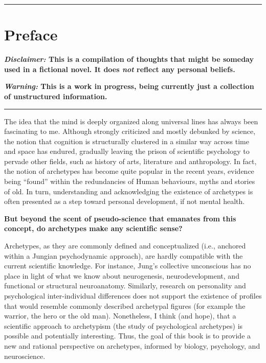 \documentclass[
]{book}
\begin{document}
\begin{center}\rule{0.5\linewidth}{0.5pt}\end{center}

\hypertarget{preface}{%
\chapter*{Preface}\label{preface}}

\textbf{\emph{Disclaimer:} This is a compilation of thoughts that might be someday used in a fictional novel. It does \emph{not} reflect any personal beliefs.}

\textbf{\emph{Warning:} This is a work in progress, being currently just a collection of unstructured information.}

\begin{center}\rule{0.5\linewidth}{0.5pt}\end{center}

The idea that the mind is deeply organized along universal lines has always been fascinating to me. Although strongly criticized and mostly debunked by science, the notion that cognition is structurally clustered in a similar way across time and space has endured, gradually leaving the prison of scientific psychology to pervade other fields, such as history of arts, literature and anthropology. In fact, the notion of archetypes has become quite popular in the recent years, evidence being ``found'' within the redundancies of Human behaviours, myths and stories of old. In turn, understanding and acknowledging the existence of archetypes is often presented as a step toward personal development, if not mental health.

\textbf{But beyond the scent of pseudo-science that emanates from this concept, do archetypes make any scientific sense?}

Archetypes, as they are commonly defined and conceptualized (i.e., anchored within a Jungian psychodynamic approach), are hardly compatible with the current scientific knowledge. For instance, Jung's collective unconscious has no place in light of what we know about neurogenesis, neurodevelopment, and functional or structural neuroanatomy. Similarly, research on personality and psychological inter-individual differences does not support the existence of profiles that would resemble commonly described archetypal figures (for example the warrior, the hero or the old man). Nonetheless, I think (and hope), that a scientific approach to archetypism (the study of psychological archetypes) is possible and potentially interesting. Thus, the goal of this book is to provide a new and rational perspective on archetypes, informed by biology, psychology, and neuroscience.
\end{document}
